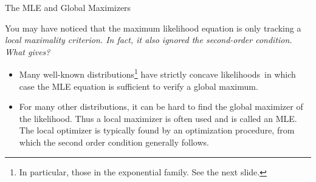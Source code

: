 \documentclass[10pt]{beamer}
\begin{document}
\begin{frame}{The MLE and Global Maximizers}

You may have noticed that the maximum likelihood equation is only tracking a \it{local} maximality criterion.  In fact, it also ignored the second-order condition. What gives?

\begin{itemize}
\item Many well-known distributions\footnote{In particular, those in the exponential family.  See the next slide.} have strictly concave likelihoods\, in which case the MLE equation is sufficient to verify a global maximum. 
\item For many other distributions, it can be hard to find the global maximizer of the likelihood. Thus a local maximizer is often used and is called an MLE.   The local optimizer is typically found by an optimization procedure, from which the second order condition generally follows.
\end{itemize}

\end{frame}
\end{document}
